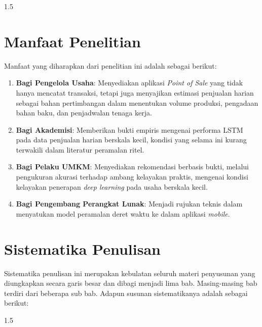 \documentclass[12pt, a4paper, onecolumn, oneside]{report}
\begin{document}
\begin{spacing}{1.5}
\section{Manfaat Penelitian}
Manfaat yang diharapkan dari penelitian ini adalah sebagai berikut:
\begin{enumerate}
    \item \textbf{Bagi Pengelola Usaha}: Menyediakan aplikasi \textit{Point of Sale} yang tidak hanya mencatat transaksi, tetapi juga menyajikan estimasi penjualan harian sebagai bahan pertimbangan dalam menentukan volume produksi, pengadaan bahan baku, dan penjadwalan tenaga kerja.
    \item \textbf{Bagi Akademisi}: Memberikan bukti empiris mengenai performa LSTM pada data penjualan harian berskala kecil, kondisi yang selama ini kurang terwakili dalam literatur peramalan ritel.
    \item \textbf{Bagi Pelaku UMKM}: Menyediakan rekomendasi berbasis bukti, melalui pengukuran akurasi terhadap ambang kelayakan praktis, mengenai kondisi kelayakan penerapan \textit{deep learning} pada usaha berskala kecil.
    \item \textbf{Bagi Pengembang Perangkat Lunak}: Menjadi rujukan teknis dalam menyatukan model peramalan deret waktu ke dalam aplikasi \textit{mobile}.
\end{enumerate}

\section{Sistematika Penulisan}
Sistematika penulisan ini merupakan kebulatan seluruh materi penyusunan yang diungkapkan secara garis besar dan dibagi menjadi lima bab. Masing-masing bab terdiri dari beberapa sub bab. Adapun susunan sistematikanya adalah sebagai berikut:

\newcommand{\babsistematika}[3]{%
  \par\noindent
  \begin{tabularx}{\textwidth}{@{}p{2.4cm}@{\hspace{0.5cm}}>{\justifying\arraybackslash\setlength{\parindent}{0pt}}X@{}}
  \textbf{#1} & \textbf{#2}\newline #3
  \end{tabularx}\par\vspace{0.2cm}}
\begin{spacing}{1.5}
\vspace{0.4cm}


\end{spacing}
\end{spacing}
\end{document}
